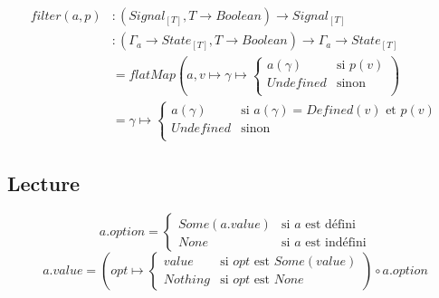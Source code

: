 		\begin{align*}
			filter(a, p)
				&\colon (Signal_{[T]}, T \to Boolean) \to Signal_{[T]} \\
				&\colon (\Gamma_a \to State_{[T]}, T \to Boolean) \to \Gamma_a \to State_{[T]} \\
				&= flatMap \left( a, v \mapsto \gamma \mapsto \begin{cases}
					a(\gamma) & \text{si } p(v)\\
					Undefined & \text{sinon}\\
				\end{cases} \right)\\
				&= \gamma \mapsto \begin{cases}
					a(\gamma) & \text{si } a(\gamma) = Defined(v) \text{ et } p(v)\\
					Undefined & \text{sinon}\\
				\end{cases}
		\end{align*}
		
	\subsection{Lecture}
	
		\[
			a.option = \begin{cases}
				Some(a.value) & \text{si } a \text{ est défini}\\
				None & \text{si } a \text{ est indéfini}
			\end{cases}
		\]
		\[
			a.value = \left(opt \mapsto \begin{cases}
				value & \text{si } opt \text{ est } Some(value)\\
				Nothing & \text{si } opt \text{ est } None
			\end{cases}\right) \circ a.option
		\]
